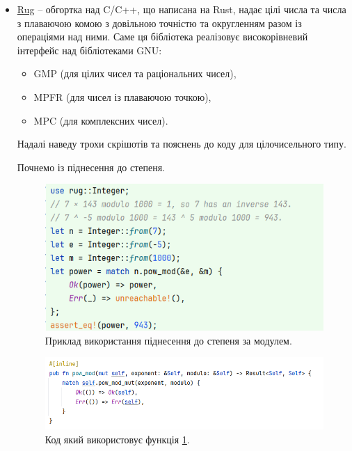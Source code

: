 \begin{itemize}
	\item \href{https://crates.io/crates/rug}{Rug} -- обгортка над C/C++, що написана на Rust, надає цілі числа та числа з плаваючою комою з довільною точністю та округленням разом із операціями над ними. Саме ця бібліотека реалізовує високорівневий інтерфейс над бібліотеками GNU:
	\begin{itemize}
		\item GMP (для цілих чисел та раціональних чисел),
		\item MPFR (для чисел із плаваючою точкою),
		\item MPC (для комплексних чисел).
	\end{itemize}
		
	Надалі наведу трохи скрішотів та пояснень до коду для цілочисельного типу.
	
	Почнемо із піднесення до степеня.
	\begin{figure}[h]
    		\centering
    		\includegraphics[scale = 0.3]{Images/pow_mod_rug}
    		\caption{Приклад використання піднесення до степеня за модулем.}
    		\label{fig:pow_mod_rug}
	\end{figure}
	
	\begin{figure}[h]
    		\centering
    		\includegraphics[scale = 0.3]{Images/pow_mod_rug_code1}
    		\caption{Код який використовує функція \ref{fig:pow_mod_rug}.}
    		\label{fig:pow_mod_rug_code1}
	\end{figure}
	

\end{itemize}
